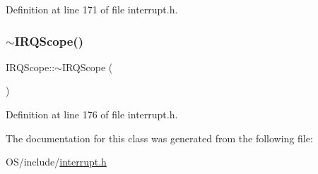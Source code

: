 Definition at line 171 of file interrupt.\+h.

\mbox{\label{class_i_r_q_scope_ad1706a38c6c745a241184565c97aff12}} 
\subsubsection{\texorpdfstring{$\sim$\+I\+R\+Q\+Scope()}{~IRQScope()}}
{\footnotesize\ttfamily I\+R\+Q\+Scope\+::$\sim$\+I\+R\+Q\+Scope (\begin{DoxyParamCaption}{ }\end{DoxyParamCaption})\hspace{0.3cm}{\ttfamily [inline]}}



Definition at line 176 of file interrupt.\+h.



The documentation for this class was generated from the following file\+:\begin{DoxyCompactItemize}
\item 
O\+S/include/\hyperlink{interrupt_8h}{interrupt.\+h}\end{DoxyCompactItemize}
